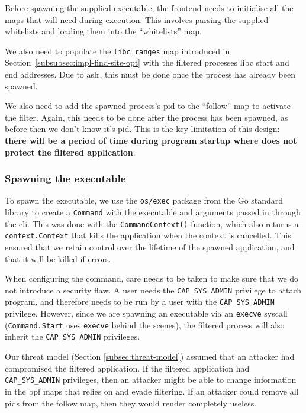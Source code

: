Before spawning the supplied executable, the frontend needs to initialise all
the maps that \af will need during execution. This involves parsing the
supplied whitelists and loading them into the ``whitelists'' map. 

We also need to populate the \texttt{libc\_ranges} map introduced in
Section~\ref{subsubsec:impl-find-site-opt} with the filtered processes \ac{libc}
start and end addresses. Due to \ac{aslr}, this must be done once the process
has already been spawned. 

We also need to add the spawned process's \ac{pid} to the ``follow'' map to
activate the filter. Again, this needs to be done after the process has been
spawned, as before then we don't know it's \ac{pid}. This is the key limitation of 
this design: \textbf{there will be a period of time during program startup where \af 
does not protect the filtered application}.

\subsubsection{Spawning the executable} \label{subsubsec:spawning-exec}

To spawn the executable, we use the \texttt{os/exec} package from the Go
standard library to create a \texttt{Command} with the executable and arguments
passed in through the \ac{cli}. This was done with the \texttt{CommandContext()}
function, which also returns a \texttt{context.Context} that kills the
application when the context is cancelled. This ensured that we retain control
over the lifetime of the spawned application, and that it will be killed if \af
errors.

When configuring the command, care needs to be taken to make sure that we do not 
introduce a security flaw. A user needs the \texttt{CAP\_SYS\_ADMIN} privilege
to attach  program, and therefore \af needs to be run by a user with
the \texttt{CAP\_SYS\_ADMIN} privilege. However, since we are spawning an
executable via an \texttt{execve} syscall (\texttt{Command.Start} uses
\texttt{execve} behind the scenes), the filtered process will also inherit the
\texttt{CAP\_SYS\_ADMIN} privileges.

Our threat model (Section \ref{subsec:threat-model}) assumed that an attacker
had compromised the filtered application. If the filtered application had
\texttt{CAP\_SYS\_ADMIN} privileges, then an attacker might be able to change
information in the \ac{bpf} maps that \af relies on and evade filtering. If an
attacker could remove all \acp{pid} from the follow map, then they would render
\af completely useless. 

